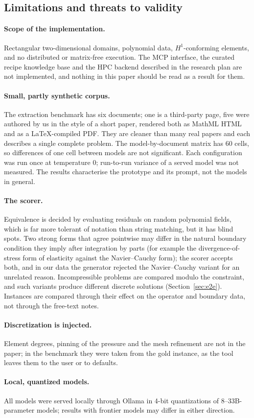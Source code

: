 \subsection{Limitations and threats to validity}
\paragraph{Scope of the implementation.} Rectangular two-dimensional domains, polynomial data, $H^1$-conforming elements, and no distributed or matrix-free execution. The MCP interface, the curated recipe knowledge base and the HPC backend described in the research plan are not implemented, and nothing in this paper should be read as a result for them.

\paragraph{Small, partly synthetic corpus.} The extraction benchmark has six documents; one is a third-party page, five were authored by us in the style of a short paper, rendered both as MathML HTML and as a LaTeX-compiled PDF. They are cleaner than many real papers and each describes a single complete problem. The model-by-document matrix has 60 cells, so differences of one cell between models are not significant. Each configuration was run once at temperature $0$; run-to-run variance of a served model was not measured. The results characterise the prototype and its prompt, not the models in general.

\paragraph{The scorer.} Equivalence is decided by evaluating residuals on random polynomial fields, which is far more tolerant of notation than string matching, but it has blind spots. Two strong forms that agree pointwise may differ in the natural boundary condition they imply after integration by parts (for example the divergence-of-stress form of elasticity against the Navier--Cauchy form); the scorer accepts both, and in our data the generator rejected the Navier--Cauchy variant for an unrelated reason. Incompressible problems are compared modulo the constraint, and such variants produce different discrete solutions (Section~\ref{sec:e2e}). Instances are compared through their effect on the operator and boundary data, not through the free-text notes.

\paragraph{Discretization is injected.} Element degrees, pinning of the pressure and the mesh refinement are not in the paper; in the benchmark they were taken from the gold instance, as the tool leaves them to the user or to defaults.

\paragraph{Local, quantized models.} All models were served locally through Ollama in 4-bit quantizations of 8--33B-parameter models; results with frontier models may differ in either direction.
